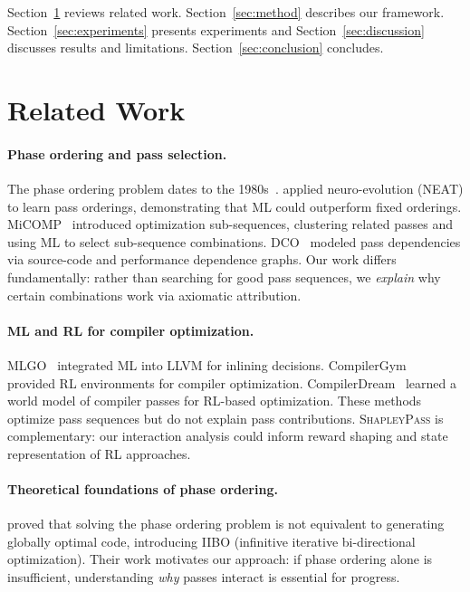 \documentclass{article}
\begin{document}
Section~\ref{sec:related} reviews related work. Section~\ref{sec:method} describes our framework. Section~\ref{sec:experiments} presents experiments and Section~\ref{sec:discussion} discusses results and limitations. Section~\ref{sec:conclusion} concludes.

\section{Related Work}
\label{sec:related}

\paragraph{Phase ordering and pass selection.}
The phase ordering problem dates to the 1980s~\citep{whitfield1997approach}. \citet{kulkarni2012mitigating} applied neuro-evolution (NEAT) to learn pass orderings, demonstrating that ML could outperform fixed orderings. MiCOMP~\citep{jantz2017micomp} introduced optimization sub-sequences, clustering related passes and using ML to select sub-sequence combinations. DCO~\citep{mammadli2024efficient} modeled pass dependencies via source-code and performance dependence graphs. Our work differs fundamentally: rather than searching for good pass sequences, we \emph{explain} why certain combinations work via axiomatic attribution.

\paragraph{ML and RL for compiler optimization.}
MLGO~\citep{trofin2021mlgo} integrated ML into LLVM for inlining decisions. CompilerGym~\citep{cummins2022compilergym} provided RL environments for compiler optimization. CompilerDream~\citep{deng2025compilerdream} learned a world model of compiler passes for RL-based optimization. These methods optimize pass sequences but do not explain pass contributions. \textsc{ShapleyPass} is complementary: our interaction analysis could inform reward shaping and state representation of RL approaches.

\paragraph{Theoretical foundations of phase ordering.}
\citet{wang2024beyond} proved that solving the phase ordering problem is not equivalent to generating globally optimal code, introducing IIBO (infinitive iterative bi-directional optimization). Their work motivates our approach: if phase ordering alone is insufficient, understanding \emph{why} passes interact is essential for progress.
\end{document}
